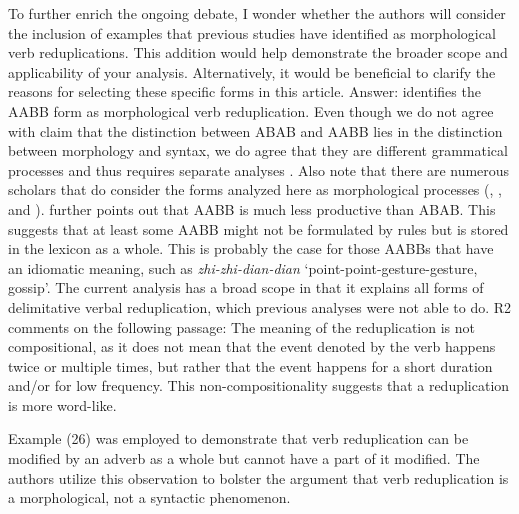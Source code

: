\documentclass[fleqn,twoside]{article}
\begin{document}
{To further enrich the ongoing debate, I wonder whether the authors will consider the inclusion of examples that previous studies have identified as morphological verb reduplications. This addition would help demonstrate the broader scope and applicability of your analysis. Alternatively, it would be beneficial to clarify the reasons for selecting these specific forms in this article.  
Answer: 
\citet{Xie2020} identifies the AABB form as morphological verb reduplication.
Even though we do not agree with  claim that the distinction between ABAB and AABB lies in the distinction between morphology and syntax,
we do agree that they are different grammatical processes and thus requires separate analyses \citep[See also][]{Deng2013, Wang2023}.
Also note that there are numerous scholars that do consider the forms analyzed here as morphological processes (\citealt[Ch. 4]{Chao1968}, \citealt[Ch. 3]{LiThompson1981}, \citealt[4--5]{Liao2014} and \citealt[Sec. 4]{Sui2018}).
\citet[83--84]{Xie2020} further points out that AABB is much less productive than ABAB.
This suggests that at least some AABB might not be formulated by rules but is stored in the lexicon as a whole.
This is probably the case for those AABBs that have an idiomatic meaning, such as \textit{zhi-zhi-dian-dian} `point-point-gesture-gesture, gossip'.
The current analysis has a broad scope in that it explains all forms of delimitative verbal reduplication, which previous analyses were not able to do.
R2 comments on the following passage: The meaning of the reduplication is not compositional, as it does
not mean that the event denoted by the verb happens twice or multiple times, but
rather that the event happens for a short duration and/or for low frequency. This
non-compositionality suggests that a reduplication is more word-like.



Example (26) was employed to demonstrate that verb reduplication can be modified by an adverb as a whole but cannot have a part of it modified. The authors utilize this observation to bolster the argument that verb reduplication is a morphological, not a syntactic phenomenon. 

}
\end{document}
